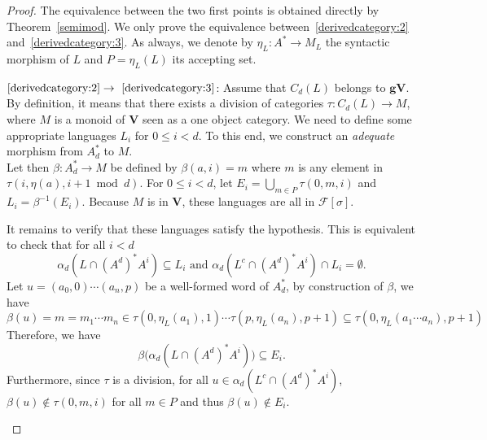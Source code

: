 \documentclass[submission,hidelink]{dmtcs-episciences}
\renewcommand{\leq}{\leqslant}
\newcommand{\V}{\mathbf{V}}
\newcommand{\gV}{\mathbf{gV}}
\newcommand{\cF}{\mathcal{F}}
\newcommand{\Ae}{A_d}
\newenvironment{conditions}
{\begin{list}{\rm (\theenumi)}{\noindent \usecounter{enumi}\setlength{\topsep}{2pt}\setlength{\partopsep}{0pt}\setlength{\itemsep}{2pt}\setlength{\parsep}{0pt}\setlength{\leftmargin}{2.5em}\setlength{\labelwidth}{1.5em}\setlength{\labelsep}{0.5em}\setlength{\listparindent}{0pt}\setlength{\itemindent}{0pt}}}{\end{list}}
\begin{document}
		\begin{proof}
			The equivalence between the two first points is obtained directly by Theorem~\ref{semimod}. We only
			prove the equivalence between~\eqref{derivedcategory:2} and~\eqref{derivedcategory:3}.
			As always, we denote by $\eta_L:A^*\to M_L$ the syntactic morphism of $L$ and $P = \eta_L(L)$ its
			accepting set.
\begin{conditions}
				\item[$\eqref{derivedcategory:2}\to~\eqref{derivedcategory:3}$:]
				Assume that $C_d(L)$ belongs to $\gV$. By definition, it means that there exists a division of categories
				$\tau:C_d(L) \to M$, where $M$ is a monoid of $\V$ seen as a one object category.
				We need to define some appropriate languages $L_i$ for $0\leq i <d$.
				To this end,
				we construct an \emph{adequate} morphism from $\Ae^*$ to $M$. \\
Let then $\beta: \Ae^* \to M$ be defined by $\beta(a,i) = m$
				where $m$ is any element in $\tau(i,\eta(a),i+1\bmod d)$.
			  For $0\leq i < d$, let $E_i = \bigcup_{m\in P}\tau(0,m,i)$ and
				$L_i=\beta^{-1}(E_i)$. Because
				$M$ is in $\V$, these languages are all in $\cF[\sigma]$.

				It remains to verify that these languages satisfy the hypothesis. This is equivalent to check that
				for all $i<d$
				$$\alpha_d(L\cap (A^d)^*A^i) \subseteq L_i\text{ and }\alpha_d(L^c\cap (A^d)^*A^i)\cap L_i =\emptyset.$$
				Let $u=(a_0,0)\cdots (a_n,p)$ be a well-formed word of $\Ae^*$, by construction of $\beta$,
				we have
				$$\beta(u) = m = m_1\cdots m_n \in  \tau(0,\eta_L(a_1),1)\cdots \tau(p,\eta_L(a_n),p+1) \subseteq \tau(0,\eta_L(a_1\cdots a_n),p+1)$$
				Therefore, we have
				$$\beta\Big(\alpha_d(L\cap (A^d)^*A^i)\Big) \subseteq E_i.$$
				Furthermore, since $\tau$ is a division, for all $u\in \alpha_d(L^c\cap (A^d)^*A^i)$,
				$\beta(u)\not \in \tau(0,m,i)$ for all $m\in P$ and thus $\beta(u)\not \in E_i$.


\end{conditions}
\end{proof}
\end{document}
